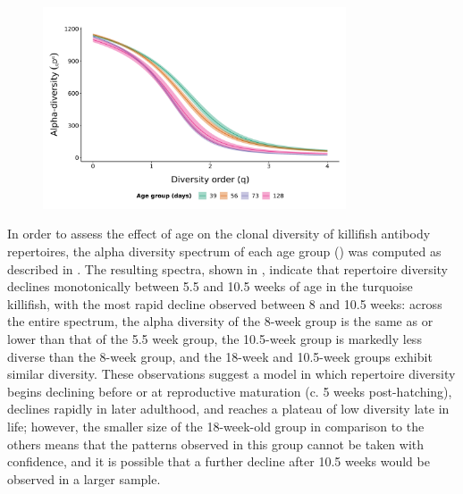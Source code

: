 \begin{figure}
\centering
\includegraphics[width = 0.8\textwidth]{_Figures/png/ageing-clone-diversity-alpha}
\label{fig:igseq-ageing-clone-diversity-alpha}
\end{figure}

In order to assess the effect of age on the clonal diversity of killifish antibody repertoires, the alpha diversity spectrum of each age group () was computed as described in . The resulting spectra, shown in , indicate that repertoire diversity declines monotonically between 5.5 and 10.5 weeks of age in the turquoise killifish, with the most rapid decline observed between 8 and 10.5 weeks: across the entire spectrum, the alpha diversity of the 8-week group is the same as or lower than that of the 5.5 week group, the 10.5-week group is markedly less diverse than the 8-week group, and the 18-week and 10.5-week groups exhibit similar diversity. These observations suggest a model in which repertoire diversity begins declining before or at reproductive maturation (c. 5 weeks post-hatching), declines rapidly in later adulthood, and reaches a plateau of low diversity late in life; however, the smaller size of the 18-week-old group in comparison to the others means that the patterns observed in this group cannot be taken with confidence, and it is possible that a further decline after 10.5 weeks would be observed in a larger sample.

